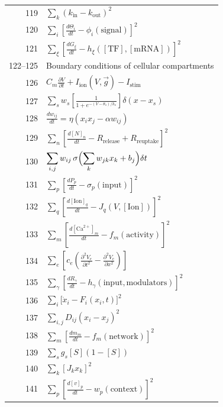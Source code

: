 \documentclass[12pt,a4paper]{article}
\begin{document}
\begin{longtable}{r p{}}
	119 & \(\displaystyle \sum_k(k_{\text{in}} - k_{\text{out}})^2\) \\
	120 & \(\displaystyle \sum_i\left[\frac{d\Theta_i}{dt} - \phi_i(\text{signal})\right]^2\) \\
	121 & \(\displaystyle \sum_\xi\left[\frac{dG_\xi}{dt} - h_\xi([\text{TF}],[\text{mRNA}])\right]^2\) \\
	122–125 & Boundary conditions of cellular compartments \\
	126 & \(\displaystyle C_m\frac{\partial V}{\partial t} + I_{\text{ion}}(V,\vec g) - I_{\text{stim}}\) \\
	127 & \(\displaystyle \sum_s w_s\left[\frac{1}{1+e^{-(V-\theta_s)/k_s}}\right]\delta(x-x_s)\) \\
	128 & \(\displaystyle \frac{dw_{ij}}{dt} = \eta(x_i x_j - \alpha w_{ij})\) \\
	129 & \(\displaystyle \sum_n\left[\frac{d[N]_n}{dt} - R_{\text{release}} + R_{\text{reuptake}}\right]^2\) \\
	130 & \(\displaystyle \sum_{i,j} w_{ij}\,\sigma\Bigl(\sum_k w_{jk}x_k + b_j\Bigr)\delta t\) \\
	131 & \(\displaystyle \sum_p\left[\frac{dP_p}{dt} - \sigma_p(\text{input})\right]^2\) \\
	132 & \(\displaystyle \sum_q\left[\frac{d[\text{Ion}]_q}{dt} - J_q(V,[\text{Ion}])\right]^2\) \\
	133 & \(\displaystyle \sum_m\left[\frac{d[\text{Ca}^{2+}]_m}{dt} - f_m(\text{activity})\right]^2\) \\
	134 & \(\displaystyle \sum_e\left[c_e\left(\frac{\partial^2 V_e}{\partial t^2} - \frac{\partial^2 V_e}{\partial x^2}\right)\right]\) \\
	135 & \(\displaystyle \sum_\gamma\left[\frac{dR_\gamma}{dt} - h_\gamma(\text{input},\text{modulators})\right]^2\) \\
	136 & \(\displaystyle \sum_i\bigl[\dot x_i - F_i(x_i,t)\bigr]^2\) \\
	137 & \(\displaystyle \sum_{i,j} D_{ij}(x_i - x_j)^2\) \\
	138 & \(\displaystyle \sum_m\left[\frac{dm_m}{dt} - f_m(\text{network})\right]^2\) \\
	139 & \(\displaystyle \sum_s g_s[S](1-[S])\) \\
	140 & \(\displaystyle \sum_k [J_k x_k]^2\) \\
	141 & \(\displaystyle \sum_p\left[\frac{d[v]_p}{dt} - w_p(\text{context})\right]^2\) \\

\end{longtable}
\end{document}
